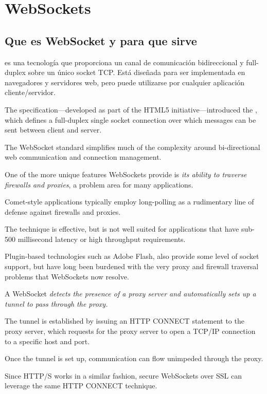 \section{WebSockets}

\subsection{Que es WebSocket y para que sirve}
 es una tecnología que proporciona un canal de comunicación
bidireccional y full-duplex sobre un único socket TCP. Está diseñada
para ser implementada en navegadores y servidores web, pero
puede utilizarse por cualquier aplicación cliente/servidor. 

The  specification—developed as part of the HTML5
initiative—introduced the , which defines
a full-duplex single socket connection over which messages can be sent
between client and server. 

The WebSocket standard simplifies much of
the complexity around bi-directional web communication and connection
management.  

One of the more unique features WebSockets provide is \emph{its
ability to traverse firewalls and proxies}, a problem area for many
applications. 

Comet-style applications typically employ long-polling
as a rudimentary line of defense against firewalls and proxies.

The
technique is effective, but is not well suited for applications that
have sub-500 millisecond latency or high throughput requirements.

Plugin-based technologies such as Adobe Flash, also provide some
level of socket support, but have long been burdened with the very
proxy and firewall traversal problems that WebSockets now resolve.

A WebSocket \emph{detects the presence of a proxy server and automatically
sets up a tunnel to pass through the proxy.} 

The tunnel is established by
issuing an HTTP CONNECT statement to the proxy server, which requests
for the proxy server to open a TCP/IP connection to a specific host
and port. 

Once the tunnel is set up, communication can flow unimpeded
through the proxy. 

Since HTTP/S works in a similar fashion, secure
WebSockets over SSL can leverage the same HTTP CONNECT technique. 

